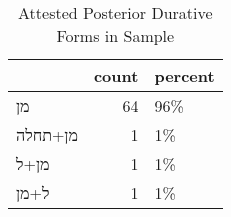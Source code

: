 \begin{table}[htbp!]
\centering
\caption{Attested Posterior Durative Forms in Sample}
\label{table:postdur_front}
\begin{tabular}{lrl}
\toprule
{} &  count & percent \\
\midrule
\texthebrew{מן}      &     64 &     96\% \\
\texthebrew{מן+תחלה} &      1 &      1\% \\
\texthebrew{מן+ל}    &      1 &      1\% \\
\texthebrew{ל+מן}    &      1 &      1\% \\
\bottomrule
\end{tabular}
\end{table}
